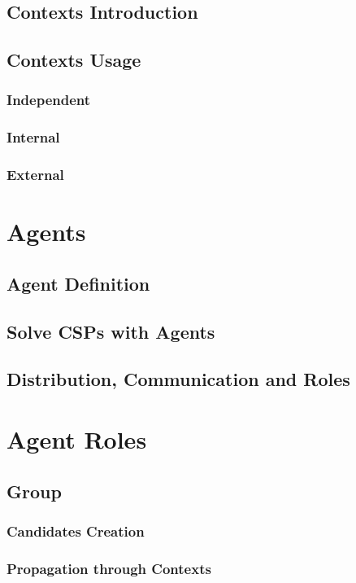\documentclass{beamer}
\begin{document}
\subsection{Contexts Introduction}
\subsection{Contexts Usage}
\subsubsection{Independent}
\subsubsection{Internal}
\subsubsection{External}

\section{Agents}
\subsection{Agent Definition}
\subsection{Solve CSPs with Agents}
\subsection{Distribution, Communication and Roles}

\section{Agent Roles}

\subsection{Group}
\subsubsection{Candidates Creation}
\subsubsection{Propagation through Contexts}
\end{document}
